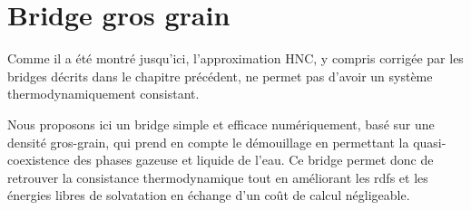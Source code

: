 \chapter{Bridge gros grain}
\label{chap:bridge}




Comme il a été montré jusqu'ici, l'approximation HNC, y compris corrigée par les bridges décrits dans le chapitre précédent, ne permet pas d'avoir un système thermodynamiquement consistant. 


Nous proposons ici un bridge simple et efficace numériquement, basé sur une densité gros-grain, qui prend en compte le démouillage en permettant la quasi-coexistence des phases gazeuse et liquide de l'eau.
Ce bridge permet donc de retrouver la consistance thermodynamique tout en améliorant les rdfs et les énergies libres de solvatation en échange d'un coût de calcul négligeable.





